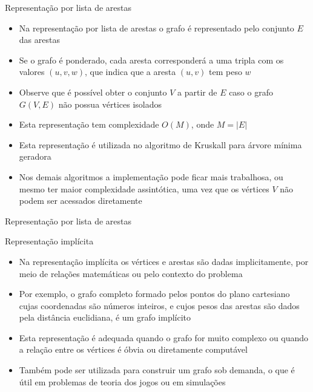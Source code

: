 \begin{frame}[fragile]{Representação por lista de arestas}

    \begin{itemize}
        \item Na representação por lista de arestas o grafo é representado pelo conjunto $E$
            das arestas

        \item Se o grafo é ponderado, cada aresta corresponderá a uma tripla com os valores
            $(u, v, w)$, que indica que a aresta $(u, v)$ tem peso $w$

        \item Observe que é possível obter o conjunto $V$ a partir de $E$ caso o grafo $G(V, E)$
            não possua vértices isolados

        \item Esta representação tem complexidade $O(M)$, onde $M = |E|$

        \item Esta representação é utilizada no algoritmo de Kruskall para árvore mínima 
            geradora

        \item Nos demais algoritmos a implementação pode ficar mais trabalhosa, ou mesmo
            ter maior complexidade assintótica, uma vez que os vértices $V$ não podem ser
            acessados diretamente
    \end{itemize}

\end{frame}



\begin{frame}[fragile]{Representação por lista de arestas}
\end{frame}

\begin{frame}[fragile]{Representação implícita}

    \begin{itemize}
        \item Na representação implícita os vértices e arestas são dadas implicitamente, por 
            meio de relações matemáticas ou pelo contexto do problema

        \item Por exemplo, o grafo completo formado pelos pontos do plano cartesiano cujas 
            coordenadas são números inteiros, e cujos pesos das arestas são dados pela distância 
            euclidiana, é um grafo implícito

        \item Esta representação é adequada quando o grafo for muito complexo ou quando a 
            relação entre os vértices é óbvia ou diretamente computável

        \item Também pode ser utilizada para construir um grafo sob demanda, o que é útil em
            problemas de teoria dos jogos ou em simulações
    \end{itemize}

\end{frame}
